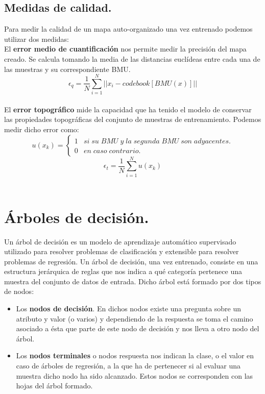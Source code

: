 \subsection{Medidas de calidad.}
Para medir la calidad de un mapa auto-organizado una vez entrenado podemos utilizar dos medidas:\\

El \textbf{error medio de cuantificación} nos permite medir la precisión del mapa creado. Se calcula tomando la media de las distancias euclídeas entre cada una de las muestras y su correspondiente BMU.\\

$$
\epsilon_q = \frac{1}{N}\sum_{i=1}^{N}  || x_i - codebook[BMU(x)] ||
$$\\

El \textbf{error topográfico} mide la capacidad que ha tenido el modelo de conservar las propiedades topográficas del conjunto de muestras de entrenamiento. Podemos medir dicho error como:\\
$$
u(x_k) = \left\{
\begin{array}{ll}
1 & si \; su \; BMU \; y \; la \; segunda \; BMU \; son \; adyacentes.\\
0 & en \; caso \; contrario.
\end{array}
\right.
$$
$$
\epsilon_t =  \frac{1}{N}\sum_{i=1}^{N} u(x_k)
$$\\

\section{Árboles de decisión.}
Un árbol de decisión \cite{arbol} es un modelo de aprendizaje automático supervisado utilizado para resolver problemas de clasificación y extensible para resolver problemas de regresión. Un árbol de decisión, una vez entrenado, consiste en una estructura jerárquica de reglas que nos indica a qué categoría pertenece una muestra del conjunto de datos de entrada. Dicho árbol está formado por dos tipos de nodos:\\

\begin{itemize}
	\item Los \textbf{nodos de decisión}. En dichos nodos existe una pregunta sobre un atributo y valor (o varios) y dependiendo de la respuesta se toma el camino asociado a ésta que parte de este nodo de decisión y nos lleva a otro nodo del árbol.
	\item Los \textbf{nodos terminales} o nodos respuesta nos indican la clase, o el valor en caso de árboles de regresión, a la que ha de pertenecer si al evaluar una muestra dicho nodo ha sido alcanzado. Estos nodos se corresponden con las hojas del árbol formado.
\end{itemize}


